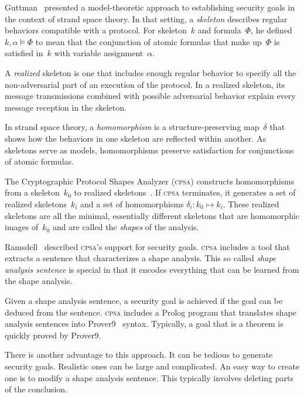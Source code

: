 \documentclass[titlepage,12pt]{article}
\newcommand{\cpsa}{\textsc{cpsa}}
\newcommand{\typ}{\mathbin:}
\begin{document}
Guttman~\cite{Guttman09} presented a model-theoretic approach to
establishing security goals in the context of strand space theory.  In
that setting, a \emph{skeleton} describes regular
behaviors compatible with a protocol.  For skeleton~$k$ and
formula~$\Phi$, he defined $k,\alpha\models\Phi$ to mean that the
conjunction of atomic formulas that make up~$\Phi$ is satisfied in~$k$
with variable assignment~$\alpha$.

A \emph{realized} skeleton is one that
includes enough regular behavior to specify all the non-adversarial
part of an execution of the protocol.  In a realized skeleton, its
message transmissions combined with possible adversarial behavior
explain every message reception in the skeleton.

In strand space theory, a \emph{homomorphism} is a
structure-preserving map~$\delta$ that shows how the behaviors in one
skeleton are reflected within another.  As skeletons serve as models,
homomorphisms preserve satisfaction for conjunctions of atomic
formulas.

The Cryptographic Protocol Shapes Analyzer ({\cpsa}) constructs
homomorphisms from a skeleton~$k_0$ to realized
skeletons~\cite{cpsa09}.  If {\cpsa} terminates, it generates a set of
realized skeletons~$k_i$ and a set of homomorphisms $\delta_i\typ
k_0\mapsto k_i$.  These realized skeletons are all the minimal,
essentially different skeletons that are homomorphic images of~$k_0$
and are called the \emph{shapes} of the analysis.

Ramsdell~\cite{Ramsdell12} described {\cpsa}'s support for security
goals. {\cpsa} includes a tool that extracts a sentence that
characterizes a shape analysis.  This so called \emph{shape analysis sentence} is special in that it
encodes everything that can be learned from the shape analysis.

Given a shape analysis sentence, a security goal is achieved if the
goal can be deduced from the sentence.  {\cpsa} includes a Prolog
program that translates shape analysis sentences into
Prover9~\cite{prover9} syntax.  Typically, a goal that
is a theorem is quickly proved by Prover9.

There is another advantage to this approach.  It can be tedious to
generate security goals.  Realistic ones can be large and complicated.
An easy way to create one is to modify a shape analysis sentence.
This typically involves deleting parts of the conclusion.
\end{document}
